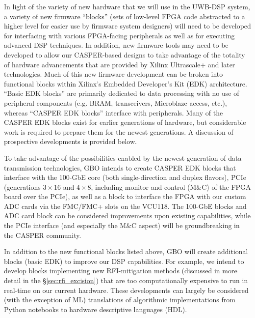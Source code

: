 \documentclass[10pt]{myNSF}
\begin{document}
\label{sec:firmware}

In light of the variety of new hardware that we will use in the
UWB-DSP system, a variety of new firmware ``blocks'' (sets of
low-level FPGA code abstracted to a higher level for easier use by
firmware system designers) will need to be developed for interfacing
with various FPGA-facing peripherals as well as for executing advanced
DSP techniques.  In addition, new firmware tools may need to be
developed to allow our CASPER-based designs to take advantage of the
totality of hardware advancements that are provided by Xilinx
Ultrascale+ and later technologies. Much of this new firmware
development can be broken into functional blocks within Xilinx’s
Embedded Developer's Kit (EDK) architecture. ``Basic EDK blocks'' are
primarily dedicated to data processing with no use of peripheral
components (e.g. BRAM, transceivers, Microblaze access, etc.), whereas
``CASPER EDK blocks'' interface with peripherals. Many of the CASPER
EDK blocks exist for earlier generations of hardware, but considerable
work is required to prepare them for the newest generations. A
discussion of prospective developments is provided below.

 To take advantage of the
possibilities enabled by the newest generation of data-transmission
technologies, GBO intends to create CASPER EDK blocks that interface
with the 100-GbE core (both single-direction and duplex flavors), PCIe
(generations $3 \times 16$ and $4 \times 8$, including monitor and
control (M\&C) of the FPGA board over the PCIe), as well as a block to
interface the FPGA with our custom ADC cards via the FMC/FMC+ slots on
the VCU118. The 100-GbE blocks and ADC card block can be considered
improvements upon existing capabilities, while the PCIe interface (and
especially the M\&C aspect) will be groundbreaking in the CASPER
community.

 In addition to the new functional
blocks listed above, GBO will create additional blocks (basic EDK) to
improve our DSP capabilities. For example, we intend to develop blocks
implementing new RFI-mitigation methods (discussed in more detail in
the \S\ref{sec:rfi_excision}) that are too computationally expensive
to run in real-time on our current hardware. These developments can
largely be considered (with the exception of ML) translations of
algorithmic implementations from Python notebooks to hardware
descriptive languages (HDL).
\end{document}
